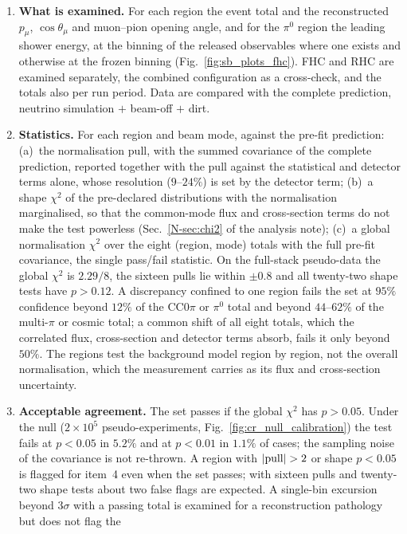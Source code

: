 \documentclass[11pt,a4paper]{article}
\newcommand{\noteref}[2]{#1~\ref{N-#2} of the analysis note}
\begin{document}
\begin{enumerate}\itemsep2pt
  \item \textbf{What is examined.} For each region the event total and the reconstructed $p_\mu$,
    $\cos\theta_\mu$ and muon--pion opening angle, and for the $\pi^0$ region the leading shower energy,
    at the binning of the released observables where one exists and otherwise at the frozen binning
    (Fig.~\ref{fig:sb_plots_fhc}). FHC and RHC are examined separately, the combined configuration as a
    cross-check, and the totals also per run period. Data are compared with the complete prediction,
    neutrino simulation $+$ beam-off $+$ dirt.
  \item \textbf{Statistics.} For each region and beam mode, against the pre-fit prediction: (a)~the
    normalisation pull, with the summed covariance of the complete prediction, reported together with
    the pull against the statistical and detector terms alone, whose resolution ($9$--$24\%$) is set by
    the detector term; (b)~a shape $\chi^2$ of the pre-declared distributions with the normalisation
    marginalised, so that the common-mode flux and cross-section terms do not make the test powerless
    (\noteref{Sec.}{sec:chi2}); (c)~a global normalisation $\chi^2$ over the eight (region, mode) totals
    with the full pre-fit covariance, the single pass/fail statistic. On the full-stack pseudo-data the
    global $\chi^2$ is $2.29/8$, the sixteen pulls lie within $\pm0.8$ and all twenty-two shape tests
    have $p>0.12$. A discrepancy confined to one region fails the set at $95\%$ confidence beyond $12\%$
    of the CC$0\pi$ or $\pi^0$ total and beyond $44$--$62\%$ of the multi-$\pi$ or cosmic total; a common
    shift of all eight totals, which the correlated flux, cross-section and detector terms absorb, fails
    it only beyond $50\%$. The regions test the background model region by region, not the overall
    normalisation, which the measurement carries as its flux and cross-section uncertainty.
  \item \textbf{Acceptable agreement.} The set passes if the global $\chi^2$ has $p>0.05$. Under the null
    ($2\times10^5$ pseudo-experiments, Fig.~\ref{fig:cr_null_calibration}) the test fails at $p<0.05$ in
    $5.2\%$ and at $p<0.01$ in $1.1\%$ of cases; the sampling noise of the covariance is not re-thrown.
    A region with $|{\rm pull}|>2$ or shape $p<0.05$ is flagged for item~4 even when the set passes; with
    sixteen pulls and twenty-two shape tests about two false flags are expected. A single-bin excursion
    beyond $3\sigma$ with a passing total is examined for a reconstruction pathology but does not flag the

\end{enumerate}
\end{document}
